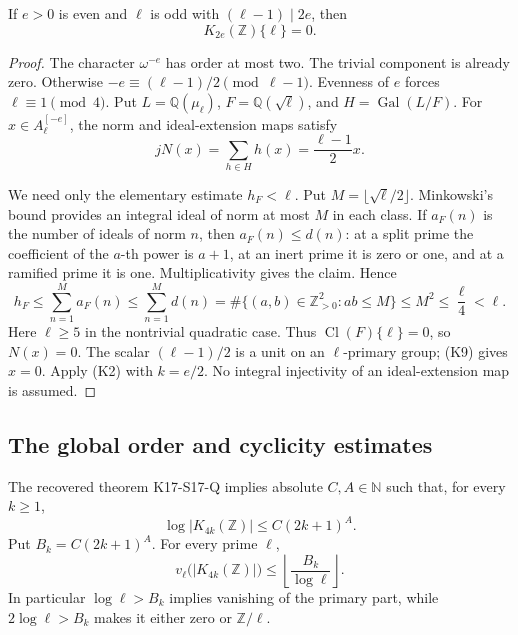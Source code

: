 \begin{theorem}[VK-EXCEPTIONS]
If \(e>0\) is even and \(\ell\) is odd with
\((\ell-1)\mid2e\), then
\[
 K_{2e}(\mathbb Z)\{\ell\}=0.                         \tag{K8}
\]
\end{theorem}

\begin{proof}
The character \(\omega^{-e}\) has order at most two.
The trivial component is already zero. Otherwise
\(-e\equiv(\ell-1)/2\pmod{\ell-1}\).
Evenness of \(e\) forces \(\ell\equiv1\pmod4\).
Put \(L=\mathbb Q(\mu_\ell)\),
\(F=\mathbb Q(\sqrt\ell)\), and \(H=\operatorname{Gal}(L/F)\).
For \(x\in A_\ell^{[-e]}\), the norm and ideal-extension maps
satisfy
\[
 jN(x)=\sum_{h\in H}h(x)=\frac{\ell-1}{2}x.           \tag{K9}
\]

We need only the elementary estimate \(h_F<\ell\).
Put \(M=\lfloor\sqrt\ell/2\rfloor\).
Minkowski's bound \cite[Theorem~4.3, p.~70]{MilneANT}
provides an integral ideal of norm at most \(M\) in each class.
If \(a_F(n)\) is the number of ideals of norm \(n\), then
\(a_F(n)\le d(n)\): at a split prime the coefficient of
the \(a\)-th power is \(a+1\), at an inert prime it is zero or
one, and at a ramified prime it is one. Multiplicativity gives
the claim. Hence
\[
 h_F\le\sum_{n=1}^M a_F(n)
 \le\sum_{n=1}^M d(n)
 =\#\{(a,b)\in\mathbb Z_{>0}^2:ab\le M\}
 \le M^2\le\frac{\ell}{4}<\ell.                      \tag{K10}
\]
Here \(\ell\ge5\) in the nontrivial quadratic case.
Thus \(\operatorname{Cl}(F)\{\ell\}=0\), so \(N(x)=0\).
The scalar \((\ell-1)/2\) is a unit on an \(\ell\)-primary
group; (K9) gives \(x=0\). Apply (K2) with \(k=e/2\).
No integral injectivity of an ideal-extension map is assumed.
\end{proof}

\subsection{The global order and cyclicity estimates}

\begin{theorem}
The recovered theorem K17-S17-Q implies absolute
\(C,A\in\mathbb N\) such that, for every \(k\ge1\),
\[
 \log|K_{4k}(\mathbb Z)|\le C(2k+1)^A.               \tag{K11}
\]
Put \(B_k=C(2k+1)^A\). For every prime \(\ell\),
\[
 v_\ell\bigl(|K_{4k}(\mathbb Z)|\bigr)
       \le\left\lfloor\frac{B_k}{\log\ell}\right\rfloor. \tag{K12}
\]
In particular \(\log\ell>B_k\) implies vanishing of the primary
part, while \(2\log\ell>B_k\) makes it either zero or
\(\mathbb Z/\ell\).
\end{theorem}

